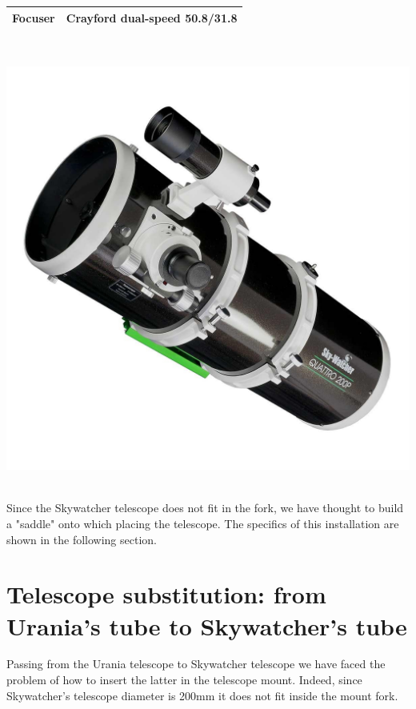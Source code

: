 \documentclass{article}
\begin{document}
\begin{multicols}{2}
\begin{minipage}{0.5\textwidth}
\begin{tabular}{c|c}
                Focuser & Crayford dual-speed 50.8/31.8 \\
                \hline
            \end{tabular}
            \label{tab_skywatcher_quattro}
        \end{minipage}
        \\
        \begin{minipage}{0.5\textwidth}
            \centering
            \includegraphics[scale=0.2]{newton-quattro-200-sky-watcher.jpg}
            \label{fig:skywatcher_telescope_mount}
        \end{minipage}
        \\
        Since the Skywatcher telescope does not fit in the fork, we have thought to build a "saddle" onto which placing the telescope.
        The specifics of this installation are shown in the following section.
         

        \section{Telescope substitution: from Urania's tube to Skywatcher's tube}
        Passing from the Urania telescope to Skywatcher telescope we have faced the problem of how to insert the latter in the telescope mount.
        Indeed, since Skywatcher's telescope diameter is 200mm it does not fit inside the mount fork.


\end{multicols}
\end{document}
